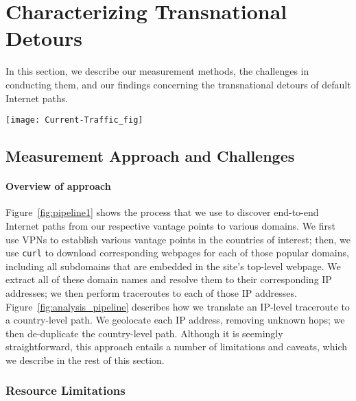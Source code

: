 \section{Characterizing Transnational Detours}
\label{datasets}
In this section, we describe our measurement methods, the challenges in
conducting them, and our findings concerning the transnational detours
of default Internet paths.

\begin{figure*}[t]
\centering
\texttt{[image: Current-Traffic\_fig]}
\caption{Measurement pipeline to study Internet paths from countries to
  popular domains.}
\label{fig:pipeline1}
\end{figure*}


\subsection{Measurement Approach and Challenges}
\label{pipeline}

\paragraph{Overview of approach}
Figure~\ref{fig:pipeline1} shows the process that we use to discover end-to-end
Internet paths from our respective vantage points to various domains. We first use
VPNs
to establish various vantage points in the countries of interest; then, we use 
{\tt curl} to download corresponding webpages for each of those popular domains,
including all subdomains that are embedded in the site's top-level webpage. We extract
all of these domain names and resolve them to their corresponding IP addresses;
we then perform traceroutes to each of those IP addresses.
Figure~\ref{fig:analysis_pipeline} describes how we translate an IP-level traceroute
to a country-level path. We geolocate each IP address, removing unknown hops; we
then de-duplicate the country-level path. Although it is seemingly straightforward,
this approach entails a number of limitations and caveats, which we describe in
the
rest of this section.

\subsubsection{Resource Limitations}
\label{resource_limits}


